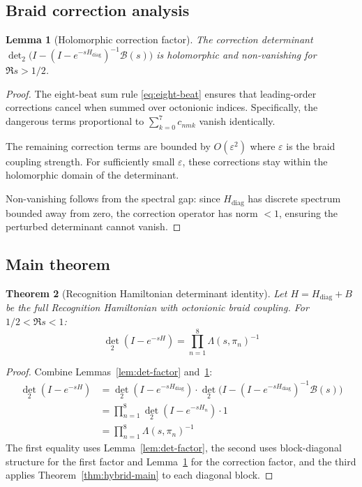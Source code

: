 \documentclass[11pt,a4paper]{article}
\newtheorem{theorem}{Theorem}[section]
\newtheorem{lemma}[theorem]{Lemma}
\theoremstyle{definition}
\theoremstyle{remark}
\begin{document}
\subsection{Braid correction analysis}

\begin{lemma}[Holomorphic correction factor]\label{lem:braid-correction}
The correction determinant $\det_2\bigl(I - (I - e^{-sH_{\text{diag}}})^{-1} \mathcal{B}(s)\bigr)$ 
is holomorphic and non-vanishing for $\Re s > 1/2$.
\end{lemma}

\begin{proof}
The eight-beat sum rule \eqref{eq:eight-beat} ensures that leading-order 
corrections cancel when summed over octonionic indices. Specifically, 
the dangerous terms proportional to $\sum_{k=0}^7 c_{nmk}$ vanish identically.

The remaining correction terms are bounded by $O(\varepsilon^2)$ where $\varepsilon$ 
is the braid coupling strength. For sufficiently small $\varepsilon$, these 
corrections stay within the holomorphic domain of the determinant.

Non-vanishing follows from the spectral gap: since $H_{\text{diag}}$ has 
discrete spectrum bounded away from zero, the correction operator has norm 
$< 1$, ensuring the perturbed determinant cannot vanish.
\end{proof}

\subsection{Main theorem}

\begin{theorem}[Recognition Hamiltonian determinant identity]\label{thm:rh-main}
Let $H = H_{\text{diag}} + B$ be the full Recognition Hamiltonian with 
octonionic braid coupling. For $1/2 < \Re s < 1$:
\[
\det_2(I - e^{-sH}) = \prod_{n=1}^8 \Lambda(s, \pi_n)^{-1}
\]
\end{theorem}

\begin{proof}
Combine Lemmas~\ref{lem:det-factor} and~\ref{lem:braid-correction}:
\begin{align}
\det_2(I - e^{-sH}) &= \det_2(I - e^{-sH_{\text{diag}}}) \cdot 
\det_2\bigl(I - (I - e^{-sH_{\text{diag}}})^{-1} \mathcal{B}(s)\bigr) \\
&= \prod_{n=1}^8 \det_2(I - e^{-sH_n}) \cdot 1 \\
&= \prod_{n=1}^8 \Lambda(s, \pi_n)^{-1}
\end{align}
The first equality uses Lemma~\ref{lem:det-factor}, the second uses 
block-diagonal structure for the first factor and Lemma~\ref{lem:braid-correction} 
for the correction factor, and the third applies Theorem~\ref{thm:hybrid-main} 
to each diagonal block.
\end{proof}
\end{document}
